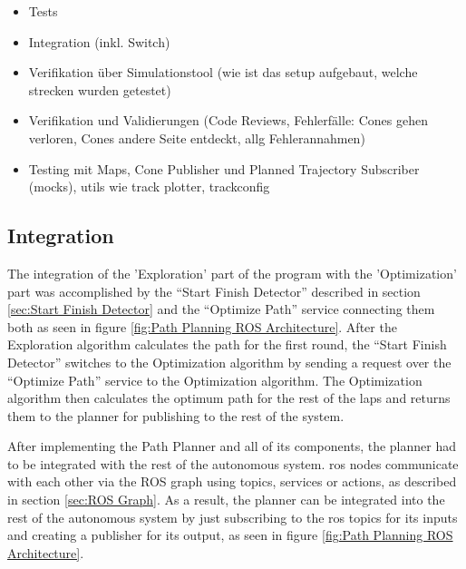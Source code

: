 \begin{itemize}
    \item Tests
    \item Integration (inkl. Switch)
    \item Verifikation über Simulationstool (wie ist das setup aufgebaut, welche strecken wurden getestet)
    \item Verifikation und Validierungen (Code Reviews, Fehlerfälle: Cones gehen verloren, Cones andere Seite entdeckt, allg Fehlerannahmen)
    \item Testing mit Maps, Cone Publisher und Planned Trajectory Subscriber (mocks), utils wie track plotter, trackconfig
\end{itemize}

\subsection{Integration} \label{sec:Integration}
The integration of the 'Exploration' part of the program with the 'Optimization' part was accomplished by the ``Start Finish Detector'' described in section \ref{sec:Start Finish Detector} and the ``Optimize Path'' service connecting them both as seen in figure \ref{fig:Path Planning ROS Architecture}. After the Exploration algorithm calculates the path for the first round, the ``Start Finish Detector'' switches to the Optimization algorithm by sending a request over the ``Optimize Path'' service to the Optimization algorithm. The Optimization algorithm then calculates the optimum path for the rest of the laps and returns them to the planner for publishing to the rest of the system.

After implementing the Path Planner and all of its components, the planner had to be integrated with the rest of the autonomous system. 
\acrshort{ros} nodes communicate with each other via the ROS graph using topics, services or actions, as described in section \ref{sec:ROS Graph}. As a result, the planner can be integrated into the rest of the autonomous system by just subscribing to the \acrshort{ros} topics for its inputs and creating a publisher for its output, as seen in figure \ref{fig:Path Planning ROS Architecture}.

